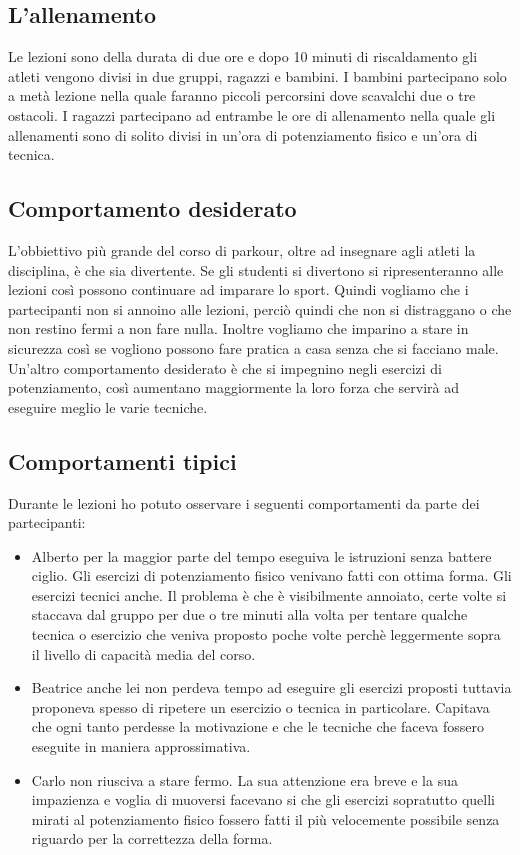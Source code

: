 \subsection{L'allenamento}

Le lezioni sono della durata di due ore e dopo 10 minuti di riscaldamento gli atleti vengono divisi in due gruppi, ragazzi e bambini. I bambini partecipano solo a metà lezione nella quale faranno piccoli percorsini dove scavalchi due o tre ostacoli. I ragazzi partecipano ad entrambe le ore di allenamento nella quale gli allenamenti sono di solito divisi in un'ora di potenziamento fisico e un'ora di tecnica.

\subsection{Comportamento desiderato}

L'obbiettivo più grande del corso di parkour, oltre ad insegnare agli atleti la disciplina, è che sia divertente. Se gli studenti si divertono si ripresenteranno alle lezioni così possono continuare ad imparare lo sport. Quindi vogliamo che i partecipanti non si annoino alle lezioni, perciò quindi che non si distraggano o che non restino fermi a non fare nulla. Inoltre vogliamo che imparino a stare in sicurezza così se vogliono possono fare pratica a casa senza che si facciano male. Un'altro comportamento desiderato è che si impegnino negli esercizi di potenziamento, così aumentano maggiormente la loro forza che servirà ad eseguire meglio le varie tecniche.

\subsection{Comportamenti tipici}

Durante le lezioni ho potuto osservare i seguenti comportamenti da parte dei partecipanti:

\begin{itemize}
  \item Alberto per la maggior parte del tempo eseguiva le istruzioni senza battere ciglio. Gli esercizi di potenziamento fisico venivano fatti con ottima forma. Gli esercizi tecnici anche. Il problema è che è visibilmente annoiato, certe volte si staccava dal gruppo per due o tre minuti alla volta per tentare qualche tecnica o esercizio che veniva proposto poche volte perchè leggermente sopra il livello di capacità media del corso.

  \item Beatrice anche lei non perdeva tempo ad eseguire gli esercizi proposti tuttavia proponeva spesso di ripetere un esercizio o tecnica in particolare. Capitava che ogni tanto perdesse la motivazione e che le tecniche che faceva fossero eseguite in maniera approssimativa.

  \item Carlo non riusciva a stare fermo. La sua attenzione era breve e la sua impazienza e voglia di muoversi facevano si che gli esercizi sopratutto quelli mirati al potenziamento fisico fossero fatti il più velocemente possibile senza riguardo per la correttezza della forma.
\end{itemize}

